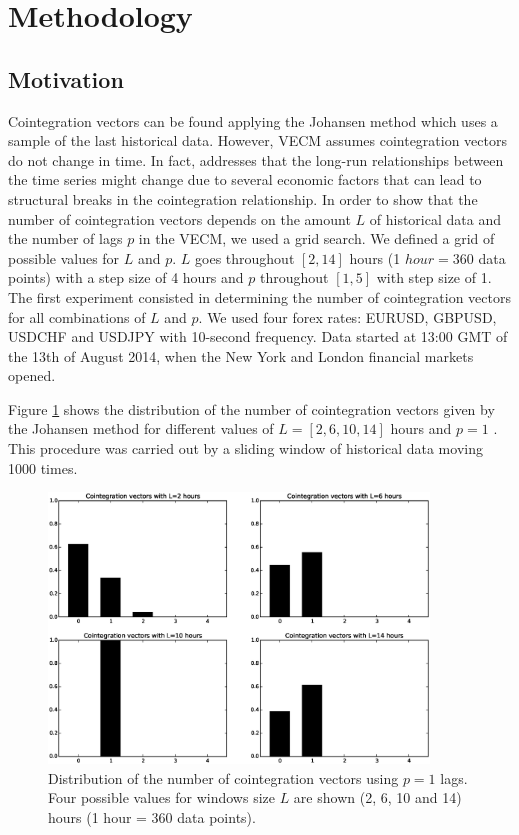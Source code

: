 \section{Methodology} \label{sec:methodology}
\subsection{Motivation} \label{sec:proposal}

Cointegration vectors can be found applying the Johansen method which uses a
sample of the last historical data. However, VECM assumes cointegration vectors
do not change in time.  In fact, \cite{gregoryETal1996} addresses that the
long-run relationships between the time series  might change due to several
economic factors that can lead to structural breaks in the cointegration
relationship.  In order to show that the number of cointegration vectors depends
on the amount $L$ of historical data and the number of lags $p$ in the VECM, we
used a grid search.  We defined a grid of possible values for $L$ and $p$. $L$
goes throughout $[2,14]$ hours (1 $hour = 360$ data points) with a step size of
4 hours and $p$ throughout $[1,5]$ with step size of 1. The first experiment
consisted in determining the number of cointegration vectors for all
combinations of $L$ and $p$.  We used four forex rates: EURUSD, GBPUSD, USDCHF
and USDJPY with 10-second frequency. Data started at 13:00 GMT of the 13th of
August 2014, when the New York and London financial markets opened.

Figure \ref{fig:hists} shows the distribution of the number of cointegration
vectors given by the Johansen method for different values of $L=[2,6,10,14]$
hours  and $p=1$ . This procedure was carried out by a sliding window of
historical data moving 1000 times.



\begin{figure}[!h]
  \centering
  \includegraphics[width=0.9\textwidth]{img/Fig1}
  \caption{Distribution of the number of cointegration vectors using $p=1$ lags.
  Four possible values for windows size $L$ are shown (2, 6, 10 and 14) hours (1
  hour = 360 data points).}
  \label{fig:hists}
\end{figure}



